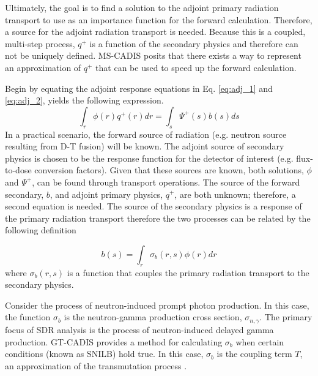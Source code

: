 
Ultimately, the goal is to find a solution to the adjoint
primary radiation transport to use as an importance
function for the forward calculation. Therefore, a
source for the adjoint radiation transport is needed.
Because this is a coupled, multi-step process, $q^{+}$ is a function of the
secondary physics and therefore can not be uniquely defined.   
MS-CADIS posits that there exists a way to represent an approximation of
$q^{+}$ that can be used to speed up the forward calculation. 

Begin by equating the adjoint
response equations in Eq. \ref{eq:adj_1} and \ref{eq:adj_2}, yields the
following expression.
 \begin{equation}\label{eq:adj_src}
	 \int_r \phi(r) q^{+}(r) dr =
	 \int_s \Psi^{+}(s) b(s) ds
 \end{equation}
In a practical scenario, the forward source of radiation (e.g. neutron
source resulting from D-T fusion) will be known.  
The adjoint source of secondary physics is chosen to be the response function for the
detector of interest (e.g. flux-to-dose conversion factors).
Given that these sources are known, both solutions, $ \phi $ and
$\Psi^{+} $, can be found through transport operations.
The source of the forward secondary, $b$,  and adjoint primary physics,
$q^{+}$, are both unknown; therefore, a second equation is needed.  
The source of the secondary physics is
a response of the primary radiation transport therefore the two processes can be related
by the following definition%

 \begin{equation}\label{eq:fwd_2src}
	 b(s) = \int_r \sigma_b(r,s) \phi(r) dr
 \end{equation}
where $\sigma_b(r,s)$ is a function that couples the primary
radiation transport to the secondary physics.

Consider the process of neutron-induced prompt photon production.
In this case, the function $\sigma_b$ is the neutron-gamma production
cross section, $\sigma_{n,\gamma}$.  The primary focus of SDR analysis
is the process of neutron-induced delayed gamma production. 
GT-CADIS provides a method for calculating $\sigma_b$ when
certain conditions (known as SNILB) hold true. In this case, $\sigma_b$ is the
coupling term $T$, an approximation of the transmutation
process \cite{gtcadis}.  

